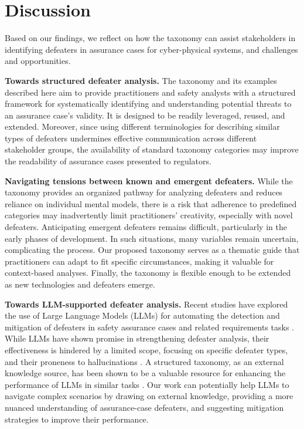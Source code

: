 \section{Discussion}
\label{sec:discussion}

Based on our findings, we reflect on how the taxonomy can assist stakeholders in identifying defeaters in assurance cases for cyber-physical systems, and challenges and opportunities.

\noindent \textbf{Towards structured defeater analysis.  }  
The taxonomy and its examples described here aim to provide practitioners and safety analysts with a 
structured framework for systematically identifying and understanding potential threats to an assurance case's validity. It is designed to be readily leveraged, reused, and extended. Moreover, since using different terminologies for describing similar types of defeaters undermines effective communication across different stakeholder groups, the availability of standard taxonomy categories may improve the readability of assurance cases presented to regulators. 

\noindent \textbf{Navigating tensions between known and emergent defeaters. } While the taxonomy provides an organized pathway for analyzing defeaters and reduces reliance on individual mental models, there is a risk that adherence to predefined categories may inadvertently limit practitioners' creativity, especially with novel defeaters. Anticipating emergent defeaters remains difficult, particularly in the early phases of development. In such situations, many variables remain uncertain, complicating the process. Our proposed taxonomy serves as a thematic guide that practitioners can adapt to fit specific circumstances, making it valuable for context-based analyses. Finally, the taxonomy is flexible enough to be extended as new technologies and defeaters emerge.

\noindent \textbf{Towards LLM-supported defeater analysis. } Recent studies have explored the use of Large Language Models (LLMs) for automating the detection and mitigation of defeaters in safety assurance cases \cite{gohar2024codefeater,AISupported} and related requirements tasks \cite{arora2024advancing}. While LLMs have shown promise in strengthening defeater analysis, their effectiveness is hindered by a limited scope, focusing on specific defeater types, %
and their proneness to hallucinations \cite{AISupported}. A structured taxonomy, as an external knowledge source, has been shown to be a valuable resource for enhancing the performance of LLMs 
in similar tasks \cite{zhou2024large}. Our work can potentially help LLMs to navigate complex scenarios by drawing on external knowledge, providing a more nuanced understanding of assurance-case defeaters, and suggesting mitigation strategies to improve their performance.
